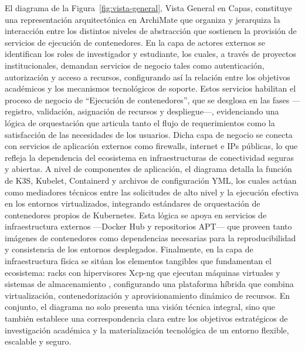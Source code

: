 El diagrama de la Figura~\ref{fig:vista-general}, Vista General en Capas, constituye una representación arquitectónica en ArchiMate que organiza y jerarquiza la interacción entre los distintos niveles de abstracción que sostienen la provisión de servicios de ejecución de contenedores. En la capa de actores externos se identifican los roles de investigador y estudiante, los cuales, a través de proyectos institucionales, demandan servicios de negocio tales como autenticación, autorización y acceso a recursos, configurando así la relación entre los objetivos académicos y los mecanismos tecnológicos de soporte. Estos servicios habilitan el proceso de negocio de “Ejecución de contenedores”, que se desglosa en las fases —registro, validación, asignación de recursos y despliegue—, evidenciando una lógica de orquestación que articula tanto el flujo de requerimientos como la satisfacción de las necesidades de los usuarios. Dicha capa de negocio se conecta con servicios de aplicación externos como firewalls, internet e IPs públicas, lo que refleja la dependencia del ecosistema en infraestructuras de conectividad seguras y abiertas. A nivel de componentes de aplicación, el diagrama detalla la función de K3S, Kubelet, Containerd y archivos de configuración YML, los cuales actúan como mediadores técnicos entre las solicitudes de alto nivel y la ejecución efectiva en los entornos virtualizados, integrando estándares de orquestación de contenedores propios de Kubernetes. Esta lógica se apoya en servicios de infraestructura externos —Docker Hub y repositorios APT— que proveen tanto imágenes de contenedores como dependencias necesarias para la reproducibilidad y consistencia de los entornos desplegados. Finalmente, en la capa de infraestructura física se sitúan los elementos tangibles que fundamentan el ecosistema: racks con hipervisores Xcp-ng que ejecutan máquinas virtuales y sistemas de almacenamiento \NAS, configurando una plataforma híbrida que combina virtualización, contenedorización y aprovisionamiento dinámico de recursos. En conjunto, el diagrama no solo presenta una visión técnica integral, sino que también establece una correspondencia clara entre los objetivos estratégicos de investigación académica y la materialización tecnológica de un entorno flexible, escalable y seguro.
